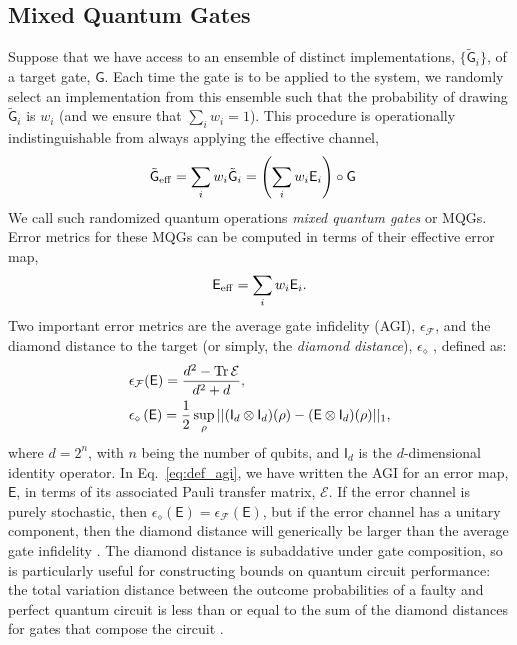 \documentclass[aps,nofootinbib,pra,notitlepage,twocolumn]{revtex4-1}
\newcommand{\tr}{{\rm Tr\thinspace}}
\newcommand{\actual}{\ensuremath{\tilde{\mathsf{G}}}}
\newcommand{\target}{\ensuremath{{\mathsf{G}}}}
\newcommand{\error}{\ensuremath{{\mathsf{E}}}}
\newcommand{\errmat}{\ensuremath{{\mathcal{E}}}}
\newcommand{\AGI}{\ensuremath{\epsilon_\mathcal{F}}}
\newcommand{\dnorm}{\ensuremath{\epsilon_\diamond}}
\newcommand{\ident}{\ensuremath{\mathsf{I}}}
\newcommand{\0}{\ensuremath{\mathbf{0}}}
\newcommand{\weight}{\ensuremath{w}}
\begin{document}
\subsection{Mixed Quantum Gates}
\label{sec:mqg}
\noindent Suppose that we have access to an ensemble of distinct implementations, 
$\{\actual_i\}$, of a target gate, $\target$.
Each time the gate is to be applied to the system, we randomly select an implementation from this ensemble such that the probability of drawing $\actual_i$ is $\weight_i$ (and we ensure that $\sum_i \weight_i=1$). This procedure is operationally indistinguishable from always applying the effective channel, 
\begin{align}
	\actual_{\rm eff} &= \sum_i \weight_i \actual_i = \left(\sum_i \weight_i \error_i \right) \circ\target
\end{align}
We call such randomized quantum operations \emph{mixed quantum gates} or MQGs. Error metrics for these MQGs can be computed in terms of their effective error map, 
\begin{equation}
	\label{eq:effective_error}
	\error_{\rm eff} = \sum_i \weight_i \error_i.
\end{equation}
Two important error metrics are the average gate infidelity (AGI), $\AGI$\cite{Johnston2011}, and the diamond distance to the target (or simply, the \emph{diamond distance}), $\dnorm$ \cite{watrous2018theory}, defined as:
\begin{align}
	\label{eq:def_agi}
	&\AGI(\error) = \frac{d^2 - \tr{\errmat}}{d^2 + d},\\
	\label{eq:def_diamond}
	&\dnorm \left(\error\right)
		= \frac{1}{2} \sup_\rho \vert \vert (\ident_d\otimes \ident_d)(\rho) 
										  - (\error \otimes \ident_d)(\rho) \vert\vert_1,
\end{align}
where $d=2^n$, with $n$ being the number of qubits, and $\ident_d$ is the $d$-dimensional identity operator.  In Eq.~\eqref{eq:def_agi}, we have written the AGI for an error map, $\error$, in terms of its associated Pauli transfer matrix, $\errmat$. If the error channel is purely stochastic, then $\dnorm(\error) = \AGI(\error)$, but if the error channel has a unitary component, then the diamond distance will generically be larger than the average gate infidelity \cite{1511.00727}. The diamond distance is subaddative \cite{watrous2018theory} under gate composition, so is particularly useful for constructing bounds on quantum circuit performance: the total variation distance between the outcome probabilities of a faulty and perfect quantum circuit is less than or equal to the sum of the diamond distances for gates that compose the circuit \cite{aharonov1998quantum}.
\end{document}
